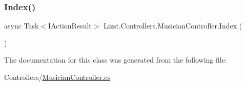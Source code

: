\subsubsection{\texorpdfstring{Index()}{Index()}}
{\footnotesize\ttfamily async Task$<$I\+Action\+Result$>$ Lizst.\+Controllers.\+Musician\+Controller.\+Index (\begin{DoxyParamCaption}{ }\end{DoxyParamCaption})}



The documentation for this class was generated from the following file\+:\begin{DoxyCompactItemize}
\item 
Controllers/\mbox{\hyperlink{_musician_controller_8cs}{Musician\+Controller.\+cs}}\end{DoxyCompactItemize}

